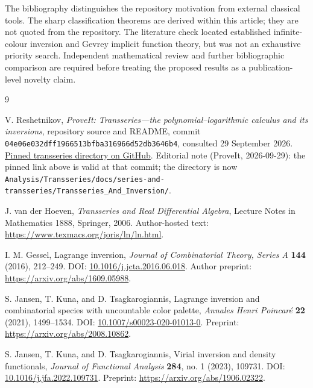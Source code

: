 \documentclass[11pt,a4paper]{article}
\numberwithin{equation}{section}
\theoremstyle{definition}
\theoremstyle{remark}
\begin{document}
The bibliography distinguishes the repository motivation from external
classical tools.  The sharp classification theorems are derived within
this article; they are not quoted from the repository.  The literature
check located established infinite-colour inversion and Gevrey implicit
function theory, but was not an exhaustive priority search.  Independent
mathematical review and further bibliographic comparison are required
before treating the proposed results as a publication-level novelty claim.

\clearpage
{}
{}
\begin{thebibliography}{9}

V. Reshetnikov,
\emph{ProveIt: Transseries---the polynomial--logarithmic calculus and its
inversions}, repository source and README,
commit \texttt{04e06e032dff1966513bfba316966d52db3646b4},
consulted 29 September 2026.
\newblock
\href{https://github.com/VladimirReshetnikov/ProveIt/tree/04e06e032dff1966513bfba316966d52db3646b4/Analysis/FabiusFunction/docs/semi-formalized-research-frontiers/drafts/series-and-transseries/Transseries_And_Inversion}{Pinned transseries directory on GitHub}.
\newblock Editorial note (ProveIt, 2026-09-29): the pinned link above is
valid at that commit; the directory is now
\nolinkurl{Analysis/Transseries/docs/series-and-transseries/Transseries_And_Inversion/}.

J. van der Hoeven,
\emph{Transseries and Real Differential Algebra},
Lecture Notes in Mathematics 1888, Springer, 2006.
\newblock Author-hosted text:
\url{https://www.texmacs.org/joris/ln/ln.html}.

I. M. Gessel,
Lagrange inversion,
\emph{Journal of Combinatorial Theory, Series A} \textbf{144} (2016),
212--249.
\newblock DOI: \href{https://doi.org/10.1016/j.jcta.2016.06.018}{10.1016/j.jcta.2016.06.018}.
\newblock Author preprint: \url{https://arxiv.org/abs/1609.05988}.

S. Jansen, T. Kuna, and D. Tsagkarogiannis,
Lagrange inversion and combinatorial species with uncountable color palette,
\emph{Annales Henri Poincar\'e} \textbf{22} (2021), 1499--1534.
\newblock DOI: \href{https://doi.org/10.1007/s00023-020-01013-0}{10.1007/s00023-020-01013-0}.
\newblock Preprint: \url{https://arxiv.org/abs/2008.10862}.

S. Jansen, T. Kuna, and D. Tsagkarogiannis,
Virial inversion and density functionals,
\emph{Journal of Functional Analysis} \textbf{284}, no. 1 (2023), 109731.
\newblock DOI: \href{https://doi.org/10.1016/j.jfa.2022.109731}{10.1016/j.jfa.2022.109731}.
\newblock Preprint: \url{https://arxiv.org/abs/1906.02322}.


\end{thebibliography}
\end{document}
